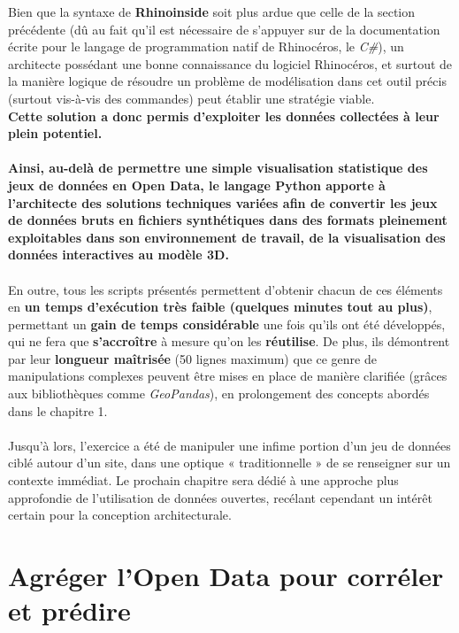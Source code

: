 \documentclass[
  11pt,
  french,
]{article}
\begin{document}
Bien que la syntaxe de \textbf{Rhinoinside} soit plus ardue que celle de
la section précédente (dû au fait qu'il est nécessaire de s'appuyer sur
de la documentation écrite pour le langage de programmation natif de
Rhinocéros, le \emph{C\#}), un architecte possédant une bonne
connaissance du logiciel Rhinocéros, et surtout de la manière logique de
résoudre un problème de modélisation dans cet outil précis (surtout
vis-à-vis des commandes) peut établir une stratégie viable.\\
\textbf{Cette solution a donc permis d'exploiter les données collectées
à leur plein potentiel.}\\
~\\
\textbf{Ainsi, au-delà de permettre une simple visualisation statistique
des jeux de données en Open Data, le langage Python apporte à
l'architecte des solutions techniques variées afin de convertir les jeux
de données bruts en fichiers synthétiques dans des formats pleinement
exploitables dans son environnement de travail, de la visualisation des
données interactives au modèle 3D.}\\
~\\
En outre, tous les scripts présentés permettent d'obtenir chacun de ces
éléments en \textbf{un temps d'exécution très faible (quelques minutes
tout au plus)}, permettant un \textbf{gain de temps considérable} une
fois qu'ils ont été développés, qui ne fera que \textbf{s'accroître} à
mesure qu'on les \textbf{réutilise}. De plus, ils démontrent par leur
\textbf{longueur maîtrisée} (50 lignes maximum) que ce genre de
manipulations complexes peuvent être mises en place de manière clarifiée
(grâces aux bibliothèques comme \emph{GeoPandas}), en prolongement des
concepts abordés dans le chapitre 1.\\
~\\
Jusqu'à lors, l'exercice a été de manipuler une infime portion d'un jeu
de données ciblé autour d'un site, dans une optique « traditionnelle »
de se renseigner sur un contexte immédiat. Le prochain chapitre sera
dédié à une approche plus approfondie de l'utilisation de données
ouvertes, recélant cependant un intérêt certain pour la conception
architecturale.

\newpage

\hypertarget{agruxe9ger-lopen-data-pour-corruxe9ler-et-pruxe9dire}{%
\section{Agréger l'Open Data pour corréler et
prédire}\label{agruxe9ger-lopen-data-pour-corruxe9ler-et-pruxe9dire}}
\end{document}
